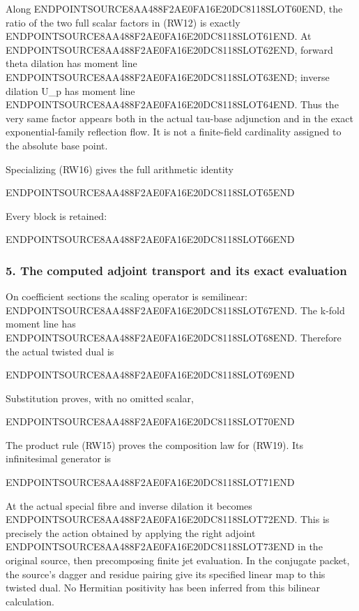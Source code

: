 Along ENDPOINTSOURCE8AA488F2AE0FA16E20DC8118SLOT60END, the ratio of the two full scalar factors in (RW12) is exactly ENDPOINTSOURCE8AA488F2AE0FA16E20DC8118SLOT61END. At ENDPOINTSOURCE8AA488F2AE0FA16E20DC8118SLOT62END, forward theta dilation has moment line ENDPOINTSOURCE8AA488F2AE0FA16E20DC8118SLOT63END; inverse dilation U\_p has moment line ENDPOINTSOURCE8AA488F2AE0FA16E20DC8118SLOT64END. Thus the very same factor appears both in the actual tau-base adjunction and in the exact exponential-family reflection flow. It is not a finite-field cardinality assigned to the absolute base point.

Specializing (RW16) gives the full arithmetic identity

ENDPOINTSOURCE8AA488F2AE0FA16E20DC8118SLOT65END

Every block is retained:

ENDPOINTSOURCE8AA488F2AE0FA16E20DC8118SLOT66END

\subsubsection{5. The computed adjoint transport and its exact evaluation}\label{endpoint-f1_reflection--the-computed-adjoint-transport-and-its-exact-evaluation}

On coefficient sections the scaling operator is semilinear: ENDPOINTSOURCE8AA488F2AE0FA16E20DC8118SLOT67END. The k-fold moment line has ENDPOINTSOURCE8AA488F2AE0FA16E20DC8118SLOT68END. Therefore the actual twisted dual is

ENDPOINTSOURCE8AA488F2AE0FA16E20DC8118SLOT69END

Substitution proves, with no omitted scalar,

ENDPOINTSOURCE8AA488F2AE0FA16E20DC8118SLOT70END

The product rule (RW15) proves the composition law for (RW19). Its infinitesimal generator is

ENDPOINTSOURCE8AA488F2AE0FA16E20DC8118SLOT71END

At the actual special fibre and inverse dilation it becomes ENDPOINTSOURCE8AA488F2AE0FA16E20DC8118SLOT72END. This is precisely the action obtained by applying the right adjoint ENDPOINTSOURCE8AA488F2AE0FA16E20DC8118SLOT73END in the original source, then precomposing finite jet evaluation. In the conjugate packet, the source's dagger and residue pairing give its specified linear map to this twisted dual. No Hermitian positivity has been inferred from this bilinear calculation.

